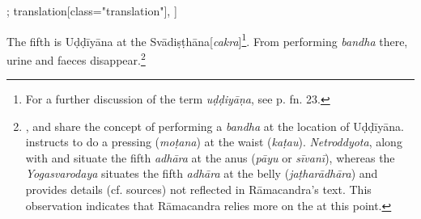 \begin{alignment}[
  texts=edition[class="edition"];
  translation[class="translation"],
  ]
\begin{translation}
\begin{tlate}[p30_02]
      
      The fifth is Uḍḍīyāna at the Svādiṣṭhāna[\textit{cakra}]\footnote{For a further discussion of the term \textit{uḍḍiyāṇa}, see p.\pageref{cakra2} fn. 23.}. From performing \textit{bandha} there, urine and faeces disappear.\footnote{,  and  share the concept of performing a \textit{bandha} at the location of Uḍḍīyāna.  instructs to do a pressing (\textit{moṭana}) at the waist (\textit{kaṭau}). \textit{Netroddyota}, along with  and  situate the fifth \textit{adhāra} at the anus (\textit{pāyu} or \textit{sīvanī}), whereas the \textit{Yogasvarodaya} situates the fifth \textit{adhāra} at the belly (\textit{jaṭharādhāra}) and provides details (cf. sources) not reflected in Rāmacandra's text. This observation indicates that Rāmacandra relies more on the  at this point.}
\flushpage
    \end{tlate}
  \end{translation}
\end{alignment}
\pagebreak %
